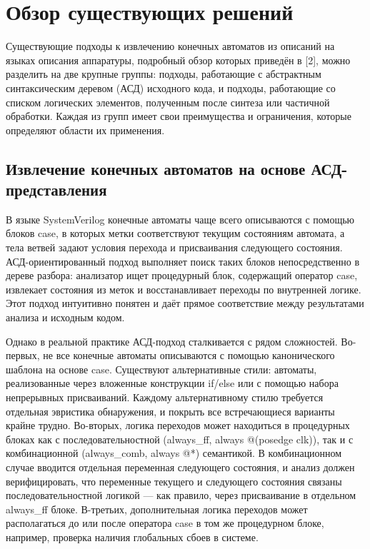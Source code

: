 \section{Обзор существующих решений}
\label{sec:Chapter2} 

Существующие подходы к извлечению конечных автоматов из описаний на языках описания аппаратуры,
подробный обзор которых приведён в [2], можно разделить на две крупные группы: подходы,
работающие с абстрактным синтаксическим деревом (АСД) исходного кода, и подходы, работающие
со списком логических элементов, полученным после синтеза или частичной обработки. Каждая из групп
имеет свои преимущества и ограничения, которые определяют области их применения.

\subsection{Извлечение конечных автоматов на основе АСД-представления}
\label{subsec:Chapter2-AST}

В языке SystemVerilog конечные автоматы чаще всего описываются с помощью блоков case,
в которых метки соответствуют текущим состояниям автомата, а тела ветвей задают условия перехода
и присваивания следующего состояния. АСД-ориентированный подход выполняет поиск таких блоков
непосредственно в дереве разбора: анализатор ищет процедурный блок, содержащий оператор case,
извлекает состояния из меток и восстанавливает переходы по внутренней логике. Этот подход интуитивно
понятен и даёт прямое соответствие между результатами анализа и исходным кодом.

Однако в реальной практике АСД-подход сталкивается с рядом сложностей. Во-первых, не все конечные
автоматы описываются с помощью канонического шаблона на основе case. Существуют альтернативные
стили: автоматы, реализованные через вложенные конструкции if/else или с помощью набора
непрерывных присваиваний. Каждому альтернативному стилю требуется отдельная
эвристика обнаружения, и покрыть все встречающиеся варианты крайне трудно.
Во-вторых, логика переходов может находиться в процедурных блоках как с последовательностной
(always\_ff, always @(posedge clk)), так и с комбинационной (always\_comb, always @*) семантикой.
В комбинационном случае вводится отдельная переменная следующего состояния, и анализ должен
верифицировать, что переменные текущего и следующего состояния связаны
последовательностной логикой --- как правило, через присваивание в отдельном
always\_ff блоке. В-третьих, дополнительная логика
переходов может располагаться до или после оператора case в том же процедурном блоке,
например, проверка наличия глобальных сбоев в системе.

